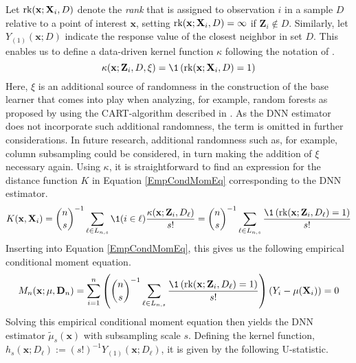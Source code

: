 Let $\text{rk}(\mathbf{x}; \mathbf{X}_i, D)$ denote the \textit{rank} that is assigned to observation $i$ in a sample $D$ relative to a point of interest $\mathbf{x}$, setting $\text{rk}(\mathbf{x}; \mathbf{X}_i, D) = \infty$ if $\mathbf{Z}_i \not\in D$.
Similarly, let $Y_{(1)}(\mathbf{x}; D)$ indicate the response value of the closest neighbor in set $D$.
This enables us to define a data-driven kernel function $\kappa$ following the notation of \citet{ritzwoller_uniform_2024}.
\begin{equation}
	\kappa(\mathbf{x}; \mathbf{Z}_i, D, \xi)
	= \1\left(\rk(\mathbf{x}; \mathbf{X}_i, D) = 1\right)
\end{equation}
Here, $\xi$ is an additional source of randomness in the construction of the base learner that comes into play when analyzing, for example, random forests as proposed by \citet{breiman_random_2001} using the CART-algorithm described in \citet{breiman_classification_2017}.
As the DNN estimator does not incorporate such additional randomness, the term is omitted in further considerations.
In future research, additional randomness such as, for example, column subsampling could be considered, in turn making the addition of $\xi$ necessary again.
Using $\kappa$, it is straightforward to find an expression for the distance function $K$ in Equation \ref{EmpCondMomEq} corresponding to the DNN estimator.
\begin{equation}\label{eq:data_distance}
	K(\mathbf{x}, \mathbf{X}_i)
	= \binom{n}{s}^{-1} \sum_{\ell \in L_{n,s}} \1(i \in \ell)\frac{\kappa(\mathbf{x}; \mathbf{Z}_i, D_{\ell})}{s!}
	= \binom{n}{s}^{-1} \sum_{\ell \in L_{n,s}} \frac{\1\left(\rk(\mathbf{x}; \mathbf{Z}_i, D_{\ell}) = 1\right)}{s!}
\end{equation}
Inserting into Equation \ref{EmpCondMomEq}, this gives us the following empirical conditional moment equation.
\begin{equation}
	\begin{aligned}
		M_n(\mathbf{x}; \mu, \mathbf{D}_n)                                                                                                               
		= \sum_{i = 1}^{n}\left(\binom{n}{s}^{-1} \sum_{\ell \in L_{n,s}} \frac{\1\left(\rk(\mathbf{x}; \mathbf{Z}_i, D_{\ell}) = 1\right)}{s!}\right)\left(Y_i - \mu(\mathbf{X}_i)\right)
		= 0
	\end{aligned}
\end{equation}
Solving this empirical conditional moment equation then yields the DNN estimator $\tilde{\mu}_{s}(\mathbf{x})$ with subsampling scale $s$.
Defining the kernel function, $h_{s}(\mathbf{x}; D_{\ell}) := (s!)^{-1} Y_{(1)}(\mathbf{x}; D_{\ell})$, it is given by the following U-statistic.
